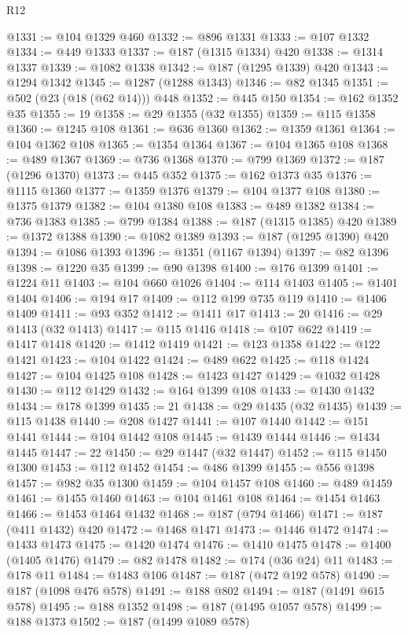 \begin{lexlean}{R12}
\begin{coremodule}
@1331 := @104 @1329 @460
@1332 := @896 @1331
@1333 := @107 @1332
@1334 := @449 @1333
@1337 := @187 (@1315 @1334) @420
@1338 := @1314 @1337
@1339 := @1082 @1338
@1342 := @187 (@1295 @1339) @420
@1343 := @1294 @1342
@1345 := @1287 (@1288 @1343)
@1346 := @82 @1345
@1351 := @502 (@23 (@18 (@62 @14))) @448
@1352 := @445 @150
@1354 := @162 @1352 @35
@1355 := 19
@1358 := @29 @1355 (@32 @1355)
@1359 := @115 @1358
@1360 := @1245 @108
@1361 := @636 @1360
@1362 := @1359 @1361
@1364 := @104 @1362 @108
@1365 := @1354 @1364
@1367 := @104 @1365 @108
@1368 := @489 @1367
@1369 := @736 @1368
@1370 := @799 @1369
@1372 := @187 (@1296 @1370)
@1373 := @445 @352
@1375 := @162 @1373 @35
@1376 := @1115 @1360
@1377 := @1359 @1376
@1379 := @104 @1377 @108
@1380 := @1375 @1379
@1382 := @104 @1380 @108
@1383 := @489 @1382
@1384 := @736 @1383
@1385 := @799 @1384
@1388 := @187 (@1315 @1385) @420
@1389 := @1372 @1388
@1390 := @1082 @1389
@1393 := @187 (@1295 @1390) @420
@1394 := @1086 @1393
@1396 := @1351 (@1167 @1394)
@1397 := @82 @1396
@1398 := @1220 @35
@1399 := @90 @1398
@1400 := @176 @1399
@1401 := @1224 @11
@1403 := @104 @660 @1026
@1404 := @114 @1403
@1405 := @1401 @1404
@1406 := @194 @17
@1409 := @112 @199 @735 @119
@1410 := @1406 @1409
@1411 := @93 @352
@1412 := @1411 @17
@1413 := 20
@1416 := @29 @1413 (@32 @1413)
@1417 := @115 @1416
@1418 := @107 @622
@1419 := @1417 @1418
@1420 := @1412 @1419
@1421 := @123 @1358
@1422 := @122 @1421
@1423 := @104 @1422
@1424 := @489 @622
@1425 := @118 @1424
@1427 := @104 @1425 @108
@1428 := @1423 @1427
@1429 := @1032 @1428
@1430 := @112 @1429
@1432 := @164 @1399 @108
@1433 := @1430 @1432
@1434 := @178 @1399
@1435 := 21
@1438 := @29 @1435 (@32 @1435)
@1439 := @115 @1438
@1440 := @208 @1427
@1441 := @107 @1440
@1442 := @151 @1441
@1444 := @104 @1442 @108
@1445 := @1439 @1444
@1446 := @1434 @1445
@1447 := 22
@1450 := @29 @1447 (@32 @1447)
@1452 := @115 @1450 @1300
@1453 := @112 @1452
@1454 := @486 @1399
@1455 := @556 @1398
@1457 := @982 @35 @1300
@1459 := @104 @1457 @108
@1460 := @489 @1459
@1461 := @1455 @1460
@1463 := @104 @1461 @108
@1464 := @1454 @1463
@1466 := @1453 @1464 @1432
@1468 := @187 (@794 @1466)
@1471 := @187 (@411 @1432) @420
@1472 := @1468 @1471
@1473 := @1446 @1472
@1474 := @1433 @1473
@1475 := @1420 @1474
@1476 := @1410 @1475
@1478 := @1400 (@1405 @1476)
@1479 := @82 @1478
@1482 := @174 (@36 @24) @11
@1483 := @178 @11
@1484 := @1483 @106
@1487 := @187 (@472 @192 @578)
@1490 := @187 (@1098 @476 @578)
@1491 := @188 @802
@1494 := @187 (@1491 @615 @578)
@1495 := @188 @1352
@1498 := @187 (@1495 @1057 @578)
@1499 := @188 @1373
@1502 := @187 (@1499 @1089 @578)

\end{coremodule}
\end{lexlean}

